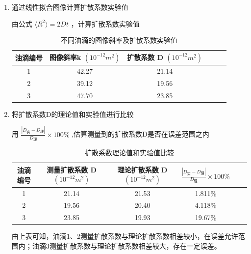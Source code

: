 \documentclass[12pt,a4paper,UTF8]{ctexart}
\begin{document}
\begin{enumerate}
\begin{enumerate}[label=\roman*.]
	\item 通过线性拟合图像计算扩散系数实验值

由公式 $\langle R^2 \rangle=2Dt$ ，计算扩散系数实验值

\begin{table}[htbp]
  \centering
  \begin{tabular}{cccccc}
    \toprule
    油滴编号 &图像斜率k $(10^{-12}m^2)$ &扩散系数 D $(10^{-12}m^2)$\\
    \midrule
    1 &42.27 &21.14  \\
    2 &39.12 &19.56  \\
    3 &47.70 &23.85  \\
    \bottomrule
  \end{tabular}
  \caption{不同油滴的图像斜率及扩散系数实验值}
  \label{tab:data}
\end{table}

\item 将扩散系数D的理论值和实验值进行比较

用 $\frac{|D_{\text{实}} - D_{\text{理}}|}{D_{\text{理}}}\times 100\%$ ,估算测量到的扩散系数D是否在误差范围之内

\begin{table}[H]
  \centering
  \begin{tabular}{cccccc}
    \toprule
    油滴编号 &测量扩散系数 D $(10^{-12}m^2)$ &理论扩散系数 D $(10^{-12}m^2)$ & $\frac{|D_{\text{实}} - D_{\text{理}}|}{D_{\text{理}}}\times 100\%$\\
    \midrule
    1 &21.14 &21.53 &1.811\% \\
    2 &19.56 &20.40 &4.118\% \\
    3 &23.85 &19.93 &19.67\% \\
    \bottomrule
  \end{tabular}
  \caption{扩散系数理论值和实验值比较}
  \label{tab:data}
\end{table}
由上表可知，油滴1、2测量扩散系数与理论扩散系数相差较小，在误差允许范围内；油滴3测量扩散系数与理论扩散系数相差较大，存在一定误差。

\end{enumerate}

\end{enumerate}
\end{document}
